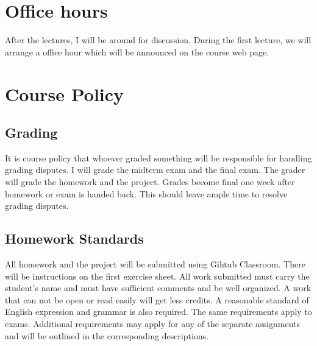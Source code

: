 \documentclass[11pt,letterpaper]{article}
\begin{document}
\section*{Office hours}
After the lectures, I will be around for discussion. During the first lecture, we will arrange a office hour which will be announced on the course web page.

\section*{Course Policy}

\subsection*{Grading}
It is course policy that whoever graded something will be responsible for handling grading disputes. I will grade the midterm exam and the final exam. The grader will grade the homework and the project. Grades become final one week after homework or exam is handed back. This should leave ample time to resolve grading disputes.

\subsection*{Homework Standards}
All homework and the project will be submitted using Gihtub Classroom. There will be instructions on the first exercise sheet. All work submitted must carry the student's name and must have sufficient comments and be well organized. A work that can not be open or read easily will get less credits.  A  reasonable standard  of  English  expression  and  grammar  is  also  required.  The  same  requirements  apply  to  exams. Additional requirements   may   apply   for   any   of   the   separate   assignments   and   will   be   outlined   in   the   corresponding descriptions.
 
\end{document}
